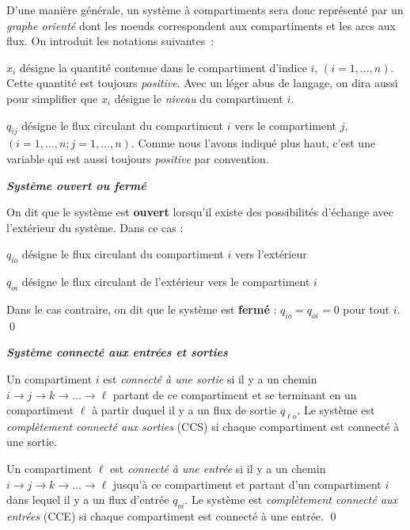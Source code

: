 D'une manière générale, un système à compartiments sera donc 
représenté par un {\em graphe orienté} dont les noeuds correspondent 
aux compartiments et les arcs aux flux. On introduit les notations suivantes~:
\begin{description}
\item $x_i$ désigne la quantité contenue dans le compartiment d'indice $i$,
$(i = 1, ... ,n)$. Cette quantité est toujours {\em positive}. Avec un léger
abus de langage, on
dira aussi pour simplifier que $x_i$ désigne le {\em niveau} du compartiment $i$.
\item $q_{ij}$ désigne le flux circulant du compartiment $i$ vers 
le compartiment $j$, $(i = 1, ... ,n ; j = 1, ... ,n)$. Comme nous l'avons indiqué 
plus haut, c'est une variable qui est aussi toujours {\em positive} par convention.
\end{description}

\begin{definition}{\bf \em Système ouvert ou fermé}

On dit que le système est {\bf ouvert} lorsqu'il existe des possibilités 
d'échange avec l'extérieur du système. Dans ce cas :
\begin{description}
\item $q_{io}$ désigne le flux circulant du compartiment $i$ vers l'extérieur
\item $q_{oi}$ désigne le flux circulant de l'extérieur vers le compartiment $i$
\end{description}
Dans le cas contraire, on dit que le système est {\bf fermé} : $q_{io} = 
q_{oi} = 0$ pour tout $i$. \qed
\end{definition}

\begin{definition}{\bf \em Système connecté aux entrées et sorties}

Un compartiment $i$ est {\it connecté à une sortie} si il y a un chemin $i \rightarrow j \rightarrow k \rightarrow \dots \rightarrow \ell$ partant de ce compartiment et se terminant en un compartiment $\ell$ à partir duquel il y a un flux de sortie $q_{\ell o}$. Le système est {\it complètement connecté aux sorties} (CCS) si chaque compartiment est connecté à une sortie.

Un compartiment $\ell$ est {\it connecté à une entrée} si il y a un chemin $i \rightarrow j \rightarrow k \rightarrow \dots \rightarrow \ell$ jusqu'à ce compartiment et partant d'un compartiment $i$ dans lequel il y a un flux d'entrée $q_{oi}$. Le système est {\it complètement connecté aux entrées} (CCE) si chaque compartiment est connecté à une entrée.  \qed 
\end{definition}


